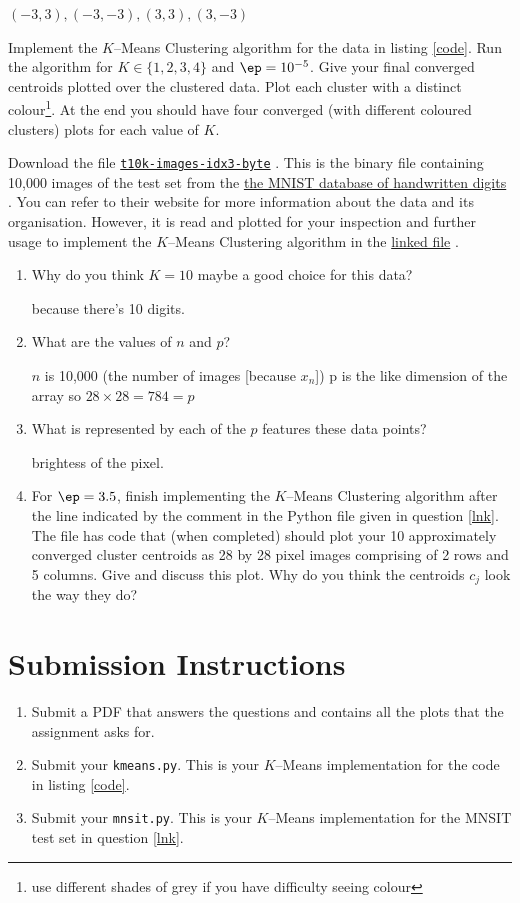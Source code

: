 \documentclass{homework}
\newcommand\sharepoint{%
  \href{%
    https://myokcuedu-my.sharepoint.com/:u:/g/personal/tashfeen_okcu_edu/EeqU1CH36W5Bp0YRgiRXxxUBuhzdI_JPec6CBlxsMBCtgA%
  }{\texttt{t10k-images-idx3-byte}}%
}
\newcommand\webarchive{%
  \href{%
    https://web.archive.org/web/20170130040655/https://yann.lecun.com/exdb/mnist/%
  }{the MNIST database of handwritten digits}%
}
\newcommand\linkedfile{%
  \href{%
    https://tashfeen.org/raw/share/ml/mnist.py%
  }{linked file}%
}
\begin{document}
\begin{sol}
  $(-3, 3), (-3, -3), (3, 3), (3, -3)$
\end{sol}

\question Implement the $K$--Means Clustering algorithm for the data
in listing \ref{code}. Run the algorithm for $K \in \{1, 2, 3, 4\}$
and $\ep = 10^{-5}$. Give your final converged centroids plotted over
the clustered data. Plot each cluster with a distinct
colour\footnote{use different shades of grey if you have difficulty
  seeing colour}. At the end you should have four converged (with
different coloured clusters) plots for each value of $K$.


\question\label{lnk} Download the file \sharepoint. This is the binary
file containing 10,000 images of the test set from the
\webarchive. You can refer to their website for more information about
the data and its organisation. However, it is read and plotted for
your inspection and further usage to implement the $K$--Means
Clustering algorithm in the \linkedfile.

\begin{enumerate}
  \item Why do you think $K=10$ maybe a good choice for this data?
    \begin{sol}
      because there's 10 digits.
    \end{sol}
  \item What are the values of $n$ and $p$?
    \begin{sol}
      $n$ is 10,000 (the number of images [because $x_n$]) p is the like dimension of the array so $28 \times 28 = 784 = p$
    \end{sol}
  \item What is represented by each of the $p$ features these data points?
    \begin{sol}
      brightess of the pixel.
    \end{sol}
  \item For $\ep = 3.5$, finish implementing the $K$--Means Clustering
        algorithm after the line indicated by the comment in the Python file
        given in question \ref{lnk}. The file has code that (when completed)
        should plot your 10 approximately converged cluster centroids as 28
        by 28 pixel images comprising of 2 rows and 5 columns. Give and
        discuss this plot. Why do you think the centroids $c_j$ look the way
        they do?
\end{enumerate}

\section*{Submission Instructions}
\begin{enumerate}
  \item Submit a PDF that answers the questions and contains all the
        plots that the assignment asks for.
  \item Submit your \texttt{kmeans.py}. This is your $K$--Means
        implementation for the code in listing \ref{code}.
  \item Submit your \texttt{mnsit.py}. This is your $K$--Means
        implementation for the MNSIT test set in question \ref{lnk}.
\end{enumerate}
\end{document}
